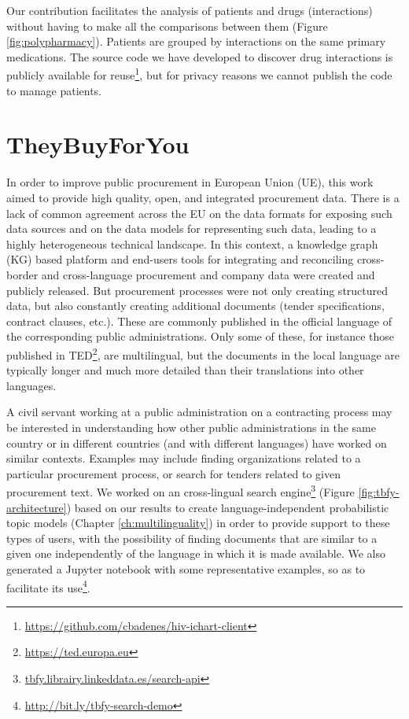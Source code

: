 Our contribution facilitates the analysis of patients and drugs (interactions) without having to make all the comparisons between them (Figure \ref{fig:polypharmacy}). Patients are grouped by interactions on the same primary medications. The source code we have developed to discover drug interactions is publicly available for reuse\footnote{\url{https://github.com/cbadenes/hiv-ichart-client}}, but for privacy reasons we cannot publish the code to manage patients. 

\section{TheyBuyForYou}
\label{sec:tbfy}

In order to improve public procurement in European Union (UE), this work \citep{Ahmet2020} aimed to provide high quality, open, and integrated procurement data. There is a lack of common agreement across the EU on the data formats for exposing such data sources and on the data models for representing such data, leading to a highly heterogeneous technical landscape. In this context, a knowledge graph (KG) based platform and end-users tools for integrating and reconciling cross-border and cross-language procurement and company data were created and publicly released. But procurement processes were not only creating structured data, but also constantly creating additional documents (tender specifications, contract clauses, etc.). These are commonly published in the official language of the corresponding public administrations. Only some of these, for instance those published in TED\footnote{\url{https://ted.europa.eu}}, are multilingual, but the documents in the local language are typically longer and much more detailed than their translations into other languages.

A civil servant working at a public administration on a contracting process may be interested in understanding how other public administrations in the same country or in different countries (and with different languages) have worked on similar contexts. Examples may include finding organizations related to a particular procurement process, or search for tenders related to given
procurement text. We worked on an cross-lingual search engine\footnote{\url{tbfy.librairy.linkeddata.es/search-api}} (Figure \ref{fig:tbfy-architecture}) based on our results to create language-independent probabilistic topic models (Chapter \ref{ch:multilinguality}) in order to provide support to these types of users, with the possibility of finding documents that are similar to a given one independently of the language in which it is made available. We also generated a Jupyter notebook with some representative examples, so as to facilitate its use\footnote{\url{http://bit.ly/tbfy-search-demo}}.

